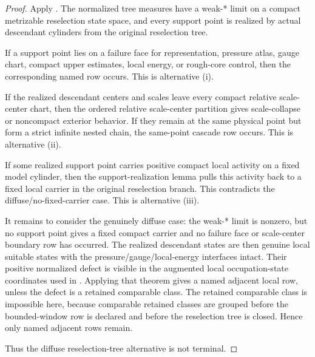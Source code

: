 \documentclass[11pt]{amsart}
\theoremstyle{plain}
\theoremstyle{definition}
\theoremstyle{remark}
\begin{document}
\begin{proof}
Apply .  The normalized
tree measures have a weak-* limit on a compact metrizable reselection state
space, and every support point is realized by actual descendant cylinders from
the original reselection tree.

If a support point lies on a failure face for representation, pressure atlas,
gauge chart, compact upper estimates, local energy, or rough-core control, then
the corresponding named row occurs.  This is alternative \textup{(i)}.

If the realized descendant centers and scales leave every compact relative
scale-center chart, then the ordered relative scale-center partition gives
scale-collapse or noncompact exterior behavior.  If they remain at the same
physical point but form a strict infinite nested chain, the same-point cascade
row occurs.  This is alternative \textup{(ii)}.

If some realized support point carries positive compact local activity on a
fixed model cylinder, then the support-realization lemma pulls this activity
back to a fixed local carrier in the original reselection branch.  This
contradicts the diffuse/no-fixed-carrier case.  This is alternative
\textup{(iii)}.

It remains to consider the genuinely diffuse case: the weak-* limit is nonzero,
but no support point gives a fixed compact carrier and no failure face or
scale-center boundary row has occurred.  The realized descendant states are
then genuine local suitable states with the pressure/gauge/local-energy
interfaces intact.  Their positive normalized defect is visible in the
augmented local occupation-state coordinates used in
.  Applying that theorem gives a
named adjacent local row, unless the defect is a retained comparable class.
The retained comparable class is impossible here, because comparable retained
classes are grouped before the bounded-window row is declared and before the
reselection tree is closed.  Hence only named adjacent rows remain.

Thus the diffuse reselection-tree alternative is not terminal.
\end{proof}
\end{document}
